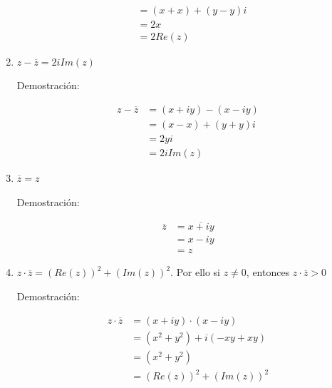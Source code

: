 \documentclass{article}
\theoremstyle{definition}
\begin{document}
\begin{enumerate}
\begin{tcolorbox}[colback=white,colframe=black]
\begin{align*}
            \end{align*}
        \end{tcolorbox}
        \begin{tcolorbox}[colback=white,colframe=black]
            \begin{align*}
                &= (x+x) + (y-y)i \\
                &= 2x \\
                &= 2Re(z)
            \end{align*}
        \end{tcolorbox}
        \item $z - \overline{z} = 2iIm(z)$
        \begin{center}
            Demostración:
        \end{center}
        \begin{tcolorbox}[colback=white,colframe=black]
            \begin{align*}
                z - \overline{z} &= (x+iy) - (x-iy) \\
                &= (x-x) + (y+y)i \\
                &= 2yi \\
                &= 2iIm(z)
            \end{align*}
        \end{tcolorbox}
        \item $\overline{z} = z$
        \begin{center}
            Demostración:
        \end{center}
        \begin{tcolorbox}[colback=white,colframe=black]
            \begin{align*}
                \overline{z} &= \overline{x+iy} \\
                &= x-iy \\
                &= z
            \end{align*}
        \end{tcolorbox}
        \item $z \cdotp \overline{z} = (Re(z))^{2} + (Im(z))^{2}$. Por ello si $z \neq 0$, entonces $z \cdotp \overline{z} > 0$
        \begin{center}
            Demostración:
        \end{center}
        \begin{tcolorbox}[colback=white,colframe=black]
            \begin{align*}
                z \cdotp \overline{z} &= (x+iy) \cdotp (x-iy) \\
                &= (x^{2}+y^{2})+i(-xy+xy) \\
                &= (x^{2}+y^{2}) \\
                &= (Re(z))^{2} + (Im(z))^{2}
            \end{align*}
        \end{tcolorbox}
    \end{enumerate}
\end{document}
